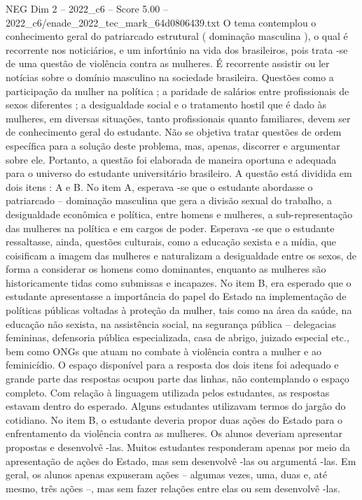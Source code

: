\begin{textsample}{NEG Dim 2 – 2022\_c6 – Score 5.00 – 2022\_c6/enade\_2022\_tec\_mark\_64d0806439.txt}
O tema contemplou o conhecimento geral do patriarcado estrutural ( dominação masculina ), o qual é recorrente nos noticiários, e um infortúnio na vida dos brasileiros, pois trata -se de uma questão de violência contra as mulheres.
É recorrente assistir ou ler notícias sobre o domínio masculino na sociedade brasileira.
Questões como a participação da mulher na política ; a paridade de salários entre profissionais de sexos diferentes ; a desigualdade social e o tratamento hostil que é dado às mulheres, em diversas situações, tanto profissionais quanto familiares, devem ser de conhecimento geral do estudante.
Não se objetiva tratar questões de ordem específica para a solução deste problema, mas, apenas, discorrer e argumentar sobre ele.
Portanto, a questão foi elaborada de maneira oportuna e adequada para o universo do estudante universitário brasileiro.
A questão está dividida em dois itens : A e B.
No item A, esperava -se que o estudante abordasse o patriarcado – dominação masculina que gera a divisão sexual do trabalho, a desigualdade econômica e política, entre homens e mulheres, a sub-representação das mulheres na política e em cargos de poder.
Esperava -se que o estudante ressaltasse, ainda, questões culturais, como a educação sexista e a mídia, que coisificam a imagem das mulheres e naturalizam a desigualdade entre os sexos, de forma a considerar os homens como dominantes, enquanto as mulheres são historicamente tidas como submissas e incapazes.
No item B, era esperado que o estudante apresentasse a importância do papel do Estado na implementação de políticas públicas voltadas à proteção da mulher, tais como na área da saúde, na educação não sexista, na assistência social, na segurança pública – delegacias femininas, defensoria pública especializada, casa de abrigo, juizado especial etc., bem como ONGs que atuam no combate à violência contra a mulher e ao feminicídio.
O espaço disponível para a resposta dos dois itens foi adequado e grande parte das respostas ocupou parte das linhas, não contemplando o espaço completo.
Com relação à linguagem utilizada pelos estudantes, as respostas estavam dentro do esperado.
Alguns estudantes utilizavam termos do jargão do cotidiano.
No item B, o estudante deveria propor duas ações do Estado para o enfrentamento da violência contra as mulheres.
Os alunos deveriam apresentar propostas e desenvolvê -las.
Muitos estudantes responderam apenas por meio da apresentação de ações do Estado, mas sem desenvolvê -las ou argumentá -las.
Em geral, os alunos apenas expuseram ações – algumas vezes, uma, duas e, até mesmo, três ações –, mas sem fazer relações entre elas ou sem desenvolvê -las.

\end{textsample}
